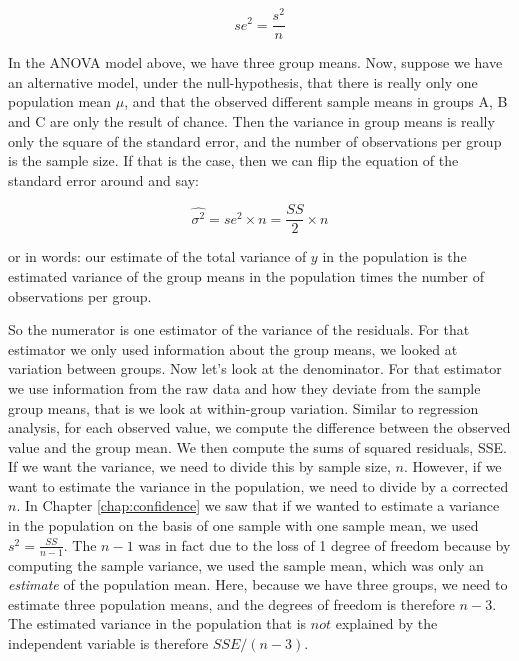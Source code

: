 \documentclass[]{book}\usepackage[]{graphicx}\usepackage[]{color}
\begin{document}
\begin{equation}
\label{MSE_estimator}
se^2 = \frac{s^2}{n} 
\end{equation}


In the ANOVA model above, we have three group means. Now, suppose we have an alternative model, under the null-hypothesis, that there is really only one population mean $\mu$, and that the observed different sample means in groups A, B and C are only the result of chance. Then the variance in group means is really only the square of the standard error, and the number of observations per group is the sample size. If that is the case, then we can flip the equation of the standard error around and say:

\begin{equation}
\widehat{\sigma^2} = se^2 \times n = \frac{SS}{2} \times n
\label{eq:MSE_estimator}
\end{equation}

or in words: our estimate of the total variance of $y$ in the population is the estimated variance of the group means in the population times the number of observations per group.

So the numerator is one estimator of the variance of the residuals. For that estimator we only used information about the group means, we looked at variation between groups. Now let's look at the denominator. For that estimator we use information from the raw data and how they deviate from the sample group means, that is we look at within-group variation. Similar to regression analysis, for each observed value, we compute the difference between the observed value and the group mean. We then compute the sums of squared residuals, SSE.  If we want the variance, we need to divide this by sample size, $n$. However, if we want to estimate the variance in the population, we need to divide by a corrected $n$. In Chapter \ref{chap:confidence} we saw that if we wanted to estimate a variance in the population on the basis of one sample with one sample mean, we used $s^2= \frac{SS}{n-1}$. The $n-1$ was in fact due to the loss of 1 degree of freedom because by computing the sample variance, we used the sample mean, which was only an \textit{estimate} of the population mean. Here, because we have three groups, we need to estimate three population means, and the degrees of freedom is therefore $n-3$. The estimated variance in the population that is $not$ explained by the independent variable is therefore $SSE/(n-3)$.
\end{document}
